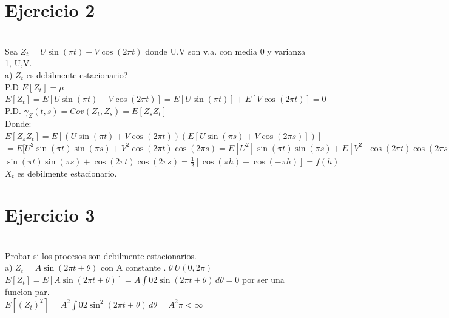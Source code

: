 \documentclass{article}
\begin{document}
\section{Ejercicio 2}\\

Sea $Z_t= U\sin(\pi t)+V\cos(2\pi t)$ donde U,V son v.a. con media 0 y varianza 1, U,V.\\

a) $Z_t$ es debilmente estacionario?\\

P.D $E[Z_t]= \mu $ \\

$E[Z_t] = E[U\sin(\pi t)+V\cos(2\pi t)] =E[U\sin(\pi t)]+E[V\cos(2\pi t)] = 0$\\

P.D. $\gamma_Z (t,s) = Cov(Z_t,Z_s) = E[Z_s Z_t]$\\


Donde: $E[Z_s Z_t] = E[(U\sin(\pi t)+V\cos(2\pi t))(E[U\sin(\pi s)+V\cos(2\pi s)])] $\\

$= E[U^2 \sin (\pi t) \sin (\pi s) + V^2 \cos (2\pi t) \cos (2\pi s) = E[U^2] \sin (\pi t) \sin (\pi s)+ E[V^2] \cos (2\pi t) \cos (2\pi s)$\\

$\sin (\pi t) \sin (\pi s) + \cos (2\pi t) \cos (2\pi s) = \frac{1}{2}[\cos (\pi h) - \cos (-\pi h)] = f(h)$\\


\therefore $X_t$ es debilmente estacionario.\\

\section{Ejercicio 3}\\


Probar si los procesos son debilmente estacionarios.\\

a) $Z_t = A \sin(2 \pi t + \theta)$  con  A  constante  . $\theta ~ U(0,2\pi)$\\

$E[Z_t]=E[A \sin(2 \pi t + \theta)] = A \int{0}{2} \sin(2\pi t + \theta) \,d\theta= 0  $  por ser una funcion par. \\


$E[(Z_t)^2]= A^2 \int{0}{2} \sin^2 (2\pi t + \theta) \,d\theta =  A^2 \pi < \infty$ \\
\end{document}
